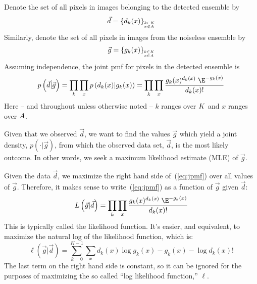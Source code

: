 Denote the set of all pixels in images belonging to the detected ensemble by
\[
\vec{d} = \left\{d_k(x)\right\}_{\stackrel{k\in K}{_{x\in A}}}
\]
Similarly, denote the set of all pixels in images from the noiseless ensemble
by
\[
\vec{g} = \left\{g_k(x)\right\}_{\stackrel{k\in K}{_{x\in A}}}
\]
Assuming independence, the joint pmf for pixels in the detected ensemble is
\begin{equation}\label{eq:jpmf}
p\left(\vec{d}| \vec{g} \right) %
= \prod_{k}\prod_{x} p\left(d_k(x)|g_k(x)\right) %
= \prod_{k}\prod_{x} \frac{g_k(x)^{d_k(x)}\; \E^{-g_k(x)}}{d_k(x)!}
\end{equation}%
Here -- and throughout unless otherwise noted -- $k$ ranges over $K$ and 
$x$ ranges over $A$.

Given that we observed $\vec{d}$, we want to find the values $\vec{g}$
which yield a joint density, $p\left(\cdot| \vec{g} \right)$, from which the observed
data set, $\vec{d} $, is the most likely outcome.  In other words, we seek a
maximum likelihood estimate (MLE) of $\vec{g}$. 

Given the data $\vec{d} $, we maximize the right hand side 
of~(\ref{eq:jpmf}) over all values of $\vec{g} $. Therefore, it makes sense to 
write~(\ref{eq:jpmf}) as a function of $\vec{g} $ given $\vec{d} $:
\begin{equation*}%
L\left(\vec{g} |\vec{d}  \right) 
= \prod_{k}\prod_{x} \frac{g_k(x)^{d_k(x)}\; \E^{-g_k(x)}}{d_k(x)!}
\end{equation*}
This is typically called the likelihood function. 
It's easier, and equivalent, to maximize the natural log
of the likelihood function, which is:
\begin{equation}\label{eq:likelihood}
\ell\left(\vec{g} |\vec{d}  \right) 
= \sum_{k=0}^{K-1} \sum_{x} d_k(x)\log g_k(x) - g_k(x) - \log
d_k(x)!
\end{equation}
The last term on the right hand side is constant, so it can be ignored for the
purposes of maximizing the so called ``log likelihood function,'' $\ell$.

